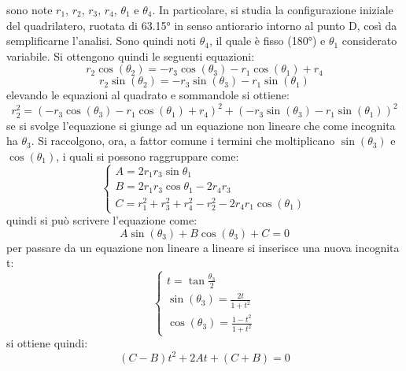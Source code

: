 \documentclass{article}
\begin{document}
sono note $r_1$,  $r_2$, $r_3$, $r_4$, $\theta_{1}$ e $\theta_{4}$.
\newpage
In particolare, si studia la configurazione iniziale del quadrilatero, ruotata di 63.15° in senso antiorario intorno al punto D, così da semplificarne l'analisi. Sono quindi noti $\theta_{4}$, il quale è fisso (180°) e $\theta_{1}$ considerato variabile. Si ottengono quindi le seguenti equazioni:
\begin{equation}
r_2\cos(\theta_{2}) = - r_3\cos(\theta_{3})  - r_1\cos(\theta_{1}) + r_4
\label{eqcosth2}
\end{equation}
\begin{equation}
r_2\sin(\theta_{2}) = - r_3\sin(\theta_{3}) - r_1\sin(\theta_{1}) 
\label{eqsinth2}
\end{equation}
elevando le equazioni al quadrato e sommandole si ottiene:
\begin{equation}
r_2^2 = \left(  - r_3\cos(\theta_{3})  - r_1\cos(\theta_{1}) + r_4 \right)^2 + \left( - r_3\sin(\theta_{3}) - r_1\sin(\theta_{1})  \right)^2
\end{equation}
se si svolge l'equazione si giunge ad un equazione non lineare che come incognita ha $\theta_{3}$. Si raccolgono, ora, a fattor comune i termini che moltiplicano $\sin(\theta_{3})$ e $\cos(\theta_{1})$, i quali si possono raggruppare come:
\begin{equation}
    \begin{cases}
    A = 2r_1r_3\sin\theta_1 \\
    B = 2r_1r_3\cos\theta_1-2r_4r_3 \\
    C = r_1^2 + r_3^2 +  r_4^2 - r_2^2 - 2r_4r_1\cos(\theta_{1})
    \end{cases}
\end{equation}
quindi si può scrivere l'equazione come:
\begin{equation}
    A\sin(\theta_{3}) + B\cos(\theta_{3}) + C = 0
\end{equation}
per passare da un equazione non lineare a lineare si inserisce una nuova incognita t:
\begin{equation}
    \begin{cases}
    t=\tan\frac{\theta_3}{2} \\
    \sin(\theta_{3}) = \frac{2t}{1 + t^2} \\
    \cos(\theta_{3}) = \frac{1 -t^2}{1 + t^2}
    \end{cases}
\end{equation}
si ottiene quindi:
\begin{equation}
    (C - B)t^2 + 2At + (C + B) = 0
    \label{eqt}
\end{equation}
\end{document}
